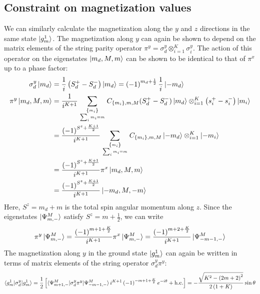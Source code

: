 \documentclass[12pt]{revtex4-2}
\begin{document}
\subsection{Constraint on magnetization values}
We can similarly calculate the magnetization along the \(y\) and \(z\) directions in the same state \(\ket{g^1_m}\). The magnetization along \(y\) can again be shown to depend on the matrix elements of the string parity operator \(\pi^y = \sigma_d^y \otimes_{i=1}^K \sigma^y_i\). The action of this operator on the eigenstates \(\ket{m_d, M, m}\) can be shown to be identical to that of \(\pi^x\) up to a phase factor:
\begin{align}
	\sigma_d^y \ket{m_d} &= \frac{1}{i}\left(S_d^+ - S_d^-\right) \ket{m_d} = \left(-1\right)^{m_d + \frac{1}{2}} \frac{1}{i}\ket{-m_d}\\
	\pi^y \ket{m_d, M,m} &= \frac{1}{i^{K+1}}\sum_{\left\{m_i\right\}\atop{\sum_i m_i = m}}C_{\left\{m_i\right\},m,M}(S_d^+ - S_d^-)\ket{m_d}\otimes_{i=1}^K \left(s_i^+ - s_i^-\right)\ket{m_i}\\
			     &= \frac{\left( -1 \right)^{S^z + \frac{K+1}{2} }}{i^{K+1}}\sum_{\left\{m_i\right\}\atop{\sum_i m_i = m}}C_{\left\{m_i\right\},m,M}\ket{-m_d}\otimes_{i=1}^K\ket{-m_i}\\
			     &= \frac{\left( -1 \right)^{S^z + \frac{K+1}{2} }}{i^{K+1}}\pi^x \ket{m_d, M, m}\\
			     &= \frac{\left( -1 \right)^{S^z + \frac{K+1}{2} }}{i^{K+1}} \ket{-m_d, M, -m}
\end{align}
Here, \(S^z = m_d + m\) is the total spin angular momentum along \(z\). Since the eigenstates \(\ket{\Psi^M_{m,-}}\) satisfy \(S^z = m + \frac{1}{2}\), we can write
\begin{equation}\begin{aligned}
	\pi^y \ket{\Psi^M_{m,-}} = \frac{\left( -1 \right)^{m + 1 + \frac{K}{2}}}{i^{K+1}} \pi^x\ket{\Psi^M_{m,-}} = \frac{\left( -1 \right)^{m + 2 + \frac{K}{2}}}{i^{K+1}} \ket{\Psi^M_{-m-1,-}}
\end{aligned}\end{equation}
The magnetization along \(y\) in the ground state \(\ket{g^1_m}\) can again be written in terms of matrix elements of the string operator \(\sigma_d^y \pi^y\):
\begin{equation}\begin{aligned}
	\label{mag_y}
	\braket{g^1_m | \sigma^y_d | g^1_m} = \frac{1}{2}\left[\braket{\Psi^M_{m+1,-}|\sigma_d^y \pi^y|\Psi^M_{-m-1,-}} i^{K+1}\left( -1 \right)^{-m + 1 + \frac{K}{2}}e^{-i\theta} + \text{h.c.}\right] = -\frac{\sqrt{K^2 - \left( 2m+2 \right) ^2}}{2\left( 1+K \right) }\sin\theta
\end{aligned}\end{equation}
\end{document}
